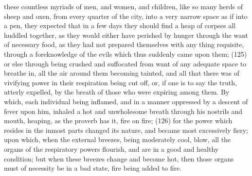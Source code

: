 these countless myriads of men, and women, and children, like so many herds of sheep and oxen,
from every quarter of the city, into a very narrow space as if into a pen, they expected that in a few
days they should find a heap of corpses all huddled together, as they would either have perished by
hunger through the want of necessary food, as they had not prepared themselves with any thing
requisite, through a foreknowledge of the evils which thus suddenly came upon them; (125) or else
through being crushed and suffocated from want of any adequate space to breathe in, all the air
around them becoming tainted, and all that there was of vivifying power in their respiration being cut
off, or, if one is to say the truth, utterly expelled, by the breath of those who were expiring among
them. By which, each individual being inflamed, and in a manner oppressed by a descent of fever
upon him, inhaled a hot and unwholesome breath through his nostrils and mouth, heaping, as the
proverb has it, fire on fire; (126) for the power which resides in the inmost parts changed its
nature, and became most excessively fiery; upon which, when the external breezes, being
moderately cool, blow, all the organs of the respiratory powers flourish, and are in a good and
healthy condition; but when these breezes change and become hot, then those organs must of
necessity be in a bad state, fire being added to fire.

